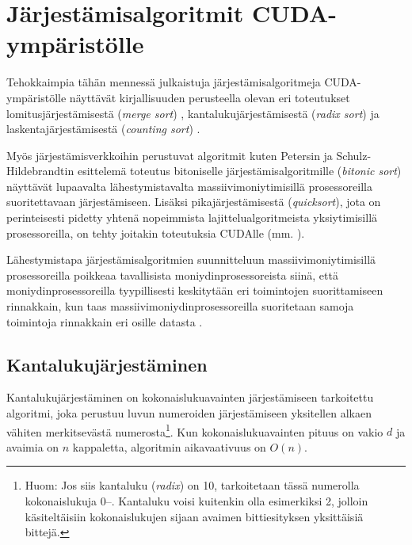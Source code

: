 \documentclass[a4paper,11pt]{article}
\newcommand{\engl}[1]{\foreignlanguage{english}{\em #1}}
\begin{document}
\section{Järjestämisalgoritmit CUDA-ympäristölle}

Tehokkaimpia tähän mennessä julkaistuja järjestämisalgoritmeja CUDA-ym\-pä\-ris\-töl\-le näyttävät kirjallisuuden perusteella olevan eri toteutukset lomitusjärjestämisestä (\engl{merge sort}) \cite{satish2009}, kantalukujärjestämisestä (\engl{radix sort}) \cite{satish2009} \cite{merrill2011} ja laskentajärjestämisestä (\engl{counting sort}) \cite{kolonias2011}.

Myös järjestämisverkkoihin perustuvat algoritmit kuten Petersin ja Schulz-Hildebrandtin \cite{peters2012gems} esittelemä toteutus bitoniselle järjestämisalgoritmille (\engl{bitonic sort}) näyttävät lupaavalta lähestymistavalta massiivimoniytimisillä prosessoreilla suoritettavaan järjestämiseen. Lisäksi pikajärjestämisestä (\engl{quicksort}), jota on perinteisesti pidetty yhtenä nopeimmista lajittelualgoritmeista yksiytimisillä prosessoreilla, on tehty joitakin toteutuksia CUDAlle (mm. \cite{cederman2009}).

Lähestymistapa järjestämisalgoritmien suunnitteluun massiivimoniytimisillä prosessoreilla poikkeaa tavallisista moniydinprosessoreista siinä, että moniydinprosessoreilla tyypillisesti keskitytään eri toimintojen suorittamiseen rinnakkain, kun taas massiivimoniydinprosessoreilla suoritetaan samoja toimintoja rinnakkain eri osille datasta \cite{satish2009}.

\subsection{Kantalukujärjestäminen}

Kantalukujärjestäminen on kokonaislukuavainten järjestämiseen tarkoitettu algoritmi, joka perustuu luvun numeroiden järjestämiseen yksitellen alkaen vähiten merkitsevästä numerosta\footnote{Huom: Jos siis kantaluku (\engl{radix}) on 10, tarkoitetaan tässä numerolla kokonaislukuja 0\thinspace--. Kantaluku voisi kuitenkin olla esimerkiksi 2, jolloin käsiteltäisiin kokonaislukujen sijaan avaimen bittiesityksen yksittäisiä bittejä.}. Kun kokonaislukuavainten pituus on vakio $d$ ja avaimia on $n$ kappaletta, algoritmin aikavaativuus on $O(n)$.
\end{document}
